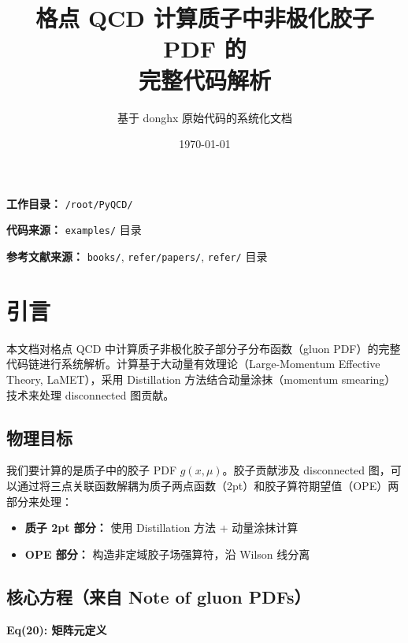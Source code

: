 \documentclass[12pt,a4paper]{ctexart}
\title{\textbf{格点 QCD 计算质子中非极化胶子 PDF 的\\完整代码解析}}
\author{基于 donghx 原始代码的系统化文档}
\date{\today}
\newcommand{\lamet}{LaMET}
\begin{document}
\maketitle
\thispagestyle{empty}

\vspace{2cm}
\begin{center}
\large
\textbf{工作目录：} \texttt{/root/PyQCD/}

\vspace{0.5cm}
\textbf{代码来源：} \texttt{examples/} 目录

\vspace{0.5cm}
\textbf{参考文献来源：} \texttt{books/}, \texttt{refer/papers/}, \texttt{refer/} 目录
\end{center}

\newpage
\tableofcontents
\newpage

\section{引言}

本文档对格点 QCD 中计算质子非极化胶子部分子分布函数（gluon PDF）的完整代码链进行系统解析。计算基于大动量有效理论（Large-Momentum Effective Theory, \lamet），采用 Distillation 方法结合动量涂抹（momentum smearing）技术来处理 disconnected 图贡献。

\subsection{物理目标}

我们要计算的是质子中的胶子 PDF $g(x,\mu)$。胶子贡献涉及 disconnected 图，可以通过将三点关联函数解耦为质子两点函数（2pt）和胶子算符期望值（OPE）两部分来处理：

\begin{itemize}
    \item \textbf{质子 2pt 部分：} 使用 Distillation 方法 + 动量涂抹计算
    \item \textbf{OPE 部分：} 构造非定域胶子场强算符，沿 Wilson 线分离
\end{itemize}

\subsection{核心方程（来自 Note of gluon PDFs）}

\textbf{Eq(20): 矩阵元定义}
\end{document}
